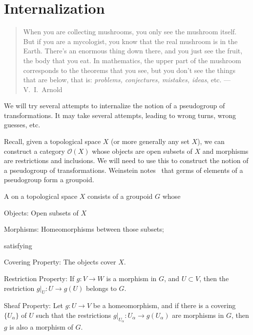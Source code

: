 \section{Internalization}

\begin{quote}
When you are collecting mushrooms, you only see the mushroom
itself. But if you are a mycologist, you know that the real
mushroom is in the Earth. There's an enormous thing down there,
and you just see the fruit, the body that you eat. In
mathematics, the upper part of the mushroom corresponds to the
theorems that you see, but you don't see the things that are
below, that is: \emph{problems, conjectures, mistakes, ideas},
etc. --- V.~I.~Arnold~\cite{arnol2004hilbert}
\end{quote}

We will try several attempts to internalize the notion of a
pseudogroup of transformations. It may take several attempts,
leading to wrong turns, wrong guesses, etc. 

Recall, given a topological space $X$ (or more generally any set
$X$), we can construct a category $\mathcal{O}(X)$ whose objects
are open subsets of $X$ and morphisms are restrictions and
inclusions. We will need to use this to construct the notion of a
pseudogroup of transformations. Weinstein notes~\cite{weinstein1996groupoids}
that germs of elements of a pseudogroup form a groupoid.

\begin{defn}
A  on a topological space $X$ consists of a
groupoid $G$ whose
\vspace{-.75pc}
\begin{description*}
\item[Objects:] Open subsets of $X$
\item[Morphisms:] Homeomorphisms between those subsets; 
\end{description*}
\vspace{-.75pc}
satisfying
\vspace{-.75pc}
\begin{description*}
\item[Covering Property:] The objects cover $X$.
\item[Restriction Property:] If $g\colon V\to W$ is a morphism in
  $G$, and $U\subset V$, then the restriction $g|_{U}\colon U\to
  g(U)$ belongs to $G$. 
\item[Sheaf Property:] Let $g\colon U\to V$ be a homeomorphism, and if
  there is a covering $\{U_{\alpha}\}$ of $U$ such that the
  restrictions $g|_{U_{\alpha}}\colon U_{\alpha}\to
  g(U_{\alpha})$ are morphisms in $G$, then $g$ is also a
  morphism of $G$.
\end{description*}
\end{defn}

